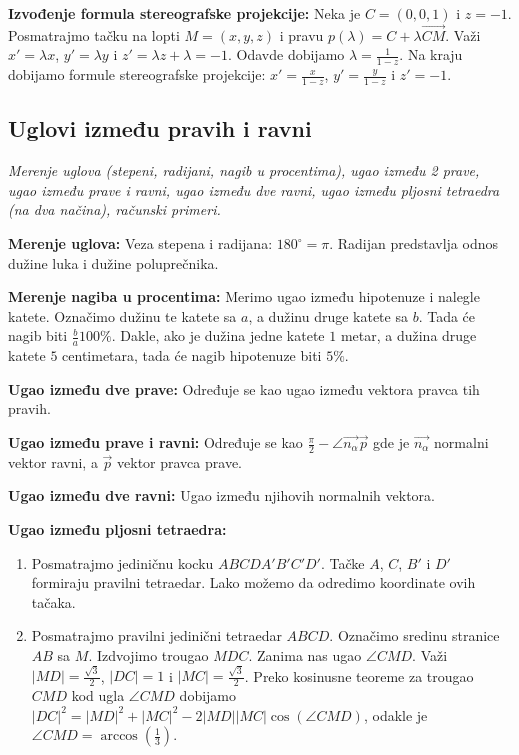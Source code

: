 \documentclass[12pt]{article}
\newcommand{\vek}[1]{\overrightarrow{#1}}
\begin{document}
\textbf{Izvođenje formula stereografske projekcije:} Neka je $C=(0,0,1)$ i
$z=-1$. Posmatrajmo tačku na lopti $M=(x,y,z)$ i pravu
$p(\lambda)=C+\lambda\vek{CM}$. Važi $x'=\lambda x$, $y'=\lambda y$ i
$z'=\lambda z+\lambda=-1$. Odavde dobijamo $\lambda=\frac{1}{1-z}$. Na kraju
dobijamo formule stereografske projekcije: $x'=\frac{x}{1-z}$,
$y'=\frac{y}{1-z}$ i $z'=-1$.


\subsection{Uglovi između pravih i ravni}
\textit{Merenje uglova (stepeni, radijani, nagib u procentima), ugao između 2
    prave, ugao između prave i ravni, ugao između dve ravni, ugao između
    pljosni tetraedra (na dva načina), računski primeri.}
\par
\vspace*{1cm}

\textbf{Merenje uglova:} Veza stepena i radijana: $180^\circ=\pi$. Radijan
predstavlja odnos dužine luka i dužine poluprečnika.
\par

\textbf{Merenje nagiba u procentima:} Merimo ugao između hipotenuze i
nalegle katete. Označimo dužinu te katete sa $a$, a dužinu druge katete
sa $b$. Tada će nagib biti $\frac{b}{a}100\%$.
Dakle, ako je dužina jedne katete $1$ metar, a dužina druge katete $5$
centimetara, tada će nagib hipotenuze biti $5\%$.
\par

\textbf{Ugao između dve prave:} Određuje se kao ugao između vektora pravca tih
pravih.
\par

\textbf{Ugao između prave i ravni:} Određuje se kao
$\frac{\pi}{2}-\angle{\vek{n_\alpha}\vek{p}}$ gde je $\vek{n_\alpha}$ normalni
vektor ravni, a $\vek{p}$ vektor pravca prave.
\par

\textbf{Ugao između dve ravni:} Ugao između njihovih normalnih vektora.
\par

\textbf{Ugao između pljosni tetraedra:}
\begin{enumerate}[label=\textbf{(\arabic*)}]
    \item Posmatrajmo jediničnu kocku $ABCDA'B'C'D'$. Tačke $A$, $C$, $B'$ i
          $D'$ formiraju pravilni tetraedar. Lako možemo da odredimo
          koordinate ovih tačaka.
    \item Posmatrajmo pravilni jedinični tetraedar $ABCD$. Označimo sredinu
          stranice $AB$ sa $M$. Izdvojimo trougao $MDC$. Zanima nas ugao
          $\angle CMD$. Važi $|MD|=\frac{\sqrt{3}}{2}$, $|DC|=1$ i
          $|MC|=\frac{\sqrt{3}}{2}$. Preko kosinusne teoreme za trougao $CMD$
          kod ugla $\angle CMD$ dobijamo
          $|DC|^2=|MD|^2+|MC|^2-2|MD||MC|\cos(\angle CMD)$, odakle je
          $\angle CMD=\arccos(\frac{1}{3})$.
\end{enumerate}
\end{document}
